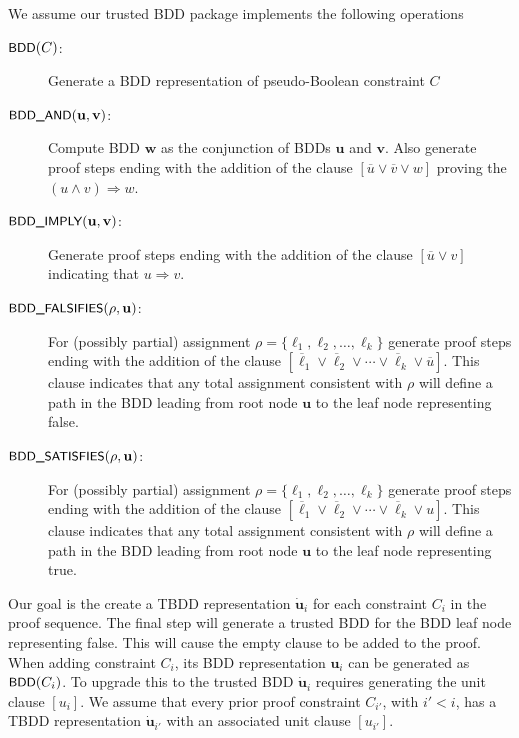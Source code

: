 \documentclass{easychair}
\renewcommand{\obar}[1]{\overline{#1}}
\newcommand{\lit}{\ell}
\newcommand{\trust}[1]{\dot {#1}}
\newcommand{\assign}{\rho}
\newcommand{\imply}{\Rightarrow}
\newcommand{\fname}[1]{\mbox{\small\sf #1}}
\newcommand{\node}[1]{\mathbf{#1}}
\newcommand{\nodeu}{\node{u}}
\newcommand{\nodev}{\node{v}}
\newcommand{\nodew}{\node{w}}
\begin{document}
We assume our trusted BDD package implements the following operations
\begin{description}
\item[$\fname{BDD}(C)$:] Generate a BDD representation of pseudo-Boolean constraint $C$
\item[$\fname{BDD\_AND}(\nodeu, \nodev)$:] Compute BDD $\nodew$ as the conjunction of BDDs $\nodeu$ and $\nodev$.  Also generate proof steps ending with the addition of the clause $[\obar{u} \lor \obar{v} \lor w]$ proving the $(u \land v) \imply w$.
\item[$\fname{BDD\_IMPLY}(\nodeu, \nodev)$:]
  Generate proof steps ending with the addition of the clause $[\obar{u} \lor v]$ indicating that $u \imply v$.
\item[$\fname{BDD\_FALSIFIES}(\assign, \nodeu)$:] For (possibly partial) assignment $\assign = \{\lit_1, \lit_2, \ldots, \lit_k\}$
  generate proof steps ending with the addition of the clause $[\obar{\lit}_1 \lor \obar{\lit}_2 \lor \cdots \lor \obar{\lit}_k \lor \obar{u}]$.
  This clause indicates
  that any total assignment consistent with $\assign$ will define a path in the BDD leading from root node $\nodeu$ to the leaf node representing false.
\item[$\fname{BDD\_SATISFIES}(\assign, \nodeu)$:] For (possibly partial) assignment $\assign = \{\lit_1, \lit_2, \ldots, \lit_k\}$
  generate proof steps ending with the addition of the clause $[\obar{\lit}_1 \lor \obar{\lit}_2 \lor \cdots \lor \obar{\lit}_k \lor u]$.
  This clause indicates
  that any total assignment consistent with $\assign$ will define a path in the BDD leading from root node $\nodeu$ to the leaf node representing true.
  
\end{description}

Our goal is the create a TBDD representation $\trust{\nodeu}_i$ for
each constraint $C_i$ in the proof sequence.  The final step will
generate a trusted BDD for the BDD leaf node representing false.  This
will cause the empty clause to be added to the proof.
When adding constraint $C_i$, its BDD
representation $\nodeu_i$ can be generated as $\fname{BDD}(C_i)$.  To upgrade
this to the trusted BDD $\trust{\nodeu}_i$ requires generating the unit clause $[u_i]$.
We assume that every prior proof constraint $C_{i'}$, with $i' < i$, has a TBDD representation $\trust{\nodeu}_{i'}$ with an associated unit clause
$[u_{i'}]$.
\end{document}
